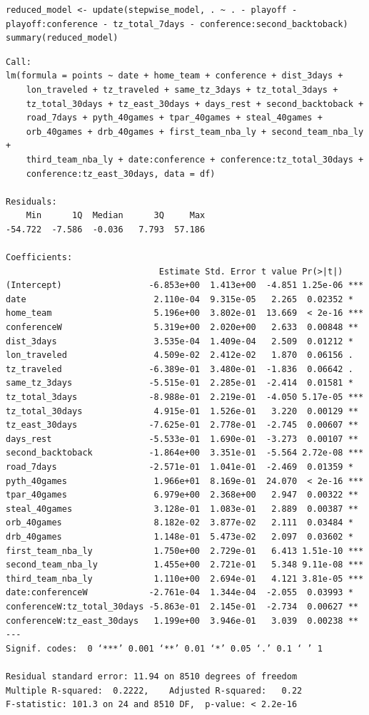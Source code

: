 \documentclass[
    12pt,
    a4paper,
    titlepage,  %
    abstract,  %
    headings=standardclasses,  %
    bibliography=totocnumbered  %
]{scrartcl}
\begin{document}
\begin{verbatim}
reduced_model <- update(stepwise_model, . ~ . - playoff - playoff:conference - tz_total_7days - conference:second_backtoback)
summary(reduced_model)
\end{verbatim}

\begin{Verbatim}
Call:
lm(formula = points ~ date + home_team + conference + dist_3days + 
    lon_traveled + tz_traveled + same_tz_3days + tz_total_3days + 
    tz_total_30days + tz_east_30days + days_rest + second_backtoback + 
    road_7days + pyth_40games + tpar_40games + steal_40games + 
    orb_40games + drb_40games + first_team_nba_ly + second_team_nba_ly + 
    third_team_nba_ly + date:conference + conference:tz_total_30days + 
    conference:tz_east_30days, data = df)

Residuals:
    Min      1Q  Median      3Q     Max 
-54.722  -7.586  -0.036   7.793  57.186 

Coefficients:
                              Estimate Std. Error t value Pr(>|t|)    
(Intercept)                 -6.853e+00  1.413e+00  -4.851 1.25e-06 ***
date                         2.110e-04  9.315e-05   2.265  0.02352 *  
home_team                    5.196e+00  3.802e-01  13.669  < 2e-16 ***
conferenceW                  5.319e+00  2.020e+00   2.633  0.00848 ** 
dist_3days                   3.535e-04  1.409e-04   2.509  0.01212 *  
lon_traveled                 4.509e-02  2.412e-02   1.870  0.06156 .  
tz_traveled                 -6.389e-01  3.480e-01  -1.836  0.06642 .  
same_tz_3days               -5.515e-01  2.285e-01  -2.414  0.01581 *  
tz_total_3days              -8.988e-01  2.219e-01  -4.050 5.17e-05 ***
tz_total_30days              4.915e-01  1.526e-01   3.220  0.00129 ** 
tz_east_30days              -7.625e-01  2.778e-01  -2.745  0.00607 ** 
days_rest                   -5.533e-01  1.690e-01  -3.273  0.00107 ** 
second_backtoback           -1.864e+00  3.351e-01  -5.564 2.72e-08 ***
road_7days                  -2.571e-01  1.041e-01  -2.469  0.01359 *  
pyth_40games                 1.966e+01  8.169e-01  24.070  < 2e-16 ***
tpar_40games                 6.979e+00  2.368e+00   2.947  0.00322 ** 
steal_40games                3.128e-01  1.083e-01   2.889  0.00387 ** 
orb_40games                  8.182e-02  3.877e-02   2.111  0.03484 *  
drb_40games                  1.148e-01  5.473e-02   2.097  0.03602 *  
first_team_nba_ly            1.750e+00  2.729e-01   6.413 1.51e-10 ***
second_team_nba_ly           1.455e+00  2.721e-01   5.348 9.11e-08 ***
third_team_nba_ly            1.110e+00  2.694e-01   4.121 3.81e-05 ***
date:conferenceW            -2.761e-04  1.344e-04  -2.055  0.03993 *  
conferenceW:tz_total_30days -5.863e-01  2.145e-01  -2.734  0.00627 ** 
conferenceW:tz_east_30days   1.199e+00  3.946e-01   3.039  0.00238 ** 
---
Signif. codes:  0 ‘***’ 0.001 ‘**’ 0.01 ‘*’ 0.05 ‘.’ 0.1 ‘ ’ 1

Residual standard error: 11.94 on 8510 degrees of freedom
Multiple R-squared:  0.2222,    Adjusted R-squared:   0.22 
F-statistic: 101.3 on 24 and 8510 DF,  p-value: < 2.2e-16
\end{Verbatim}
\end{document}
